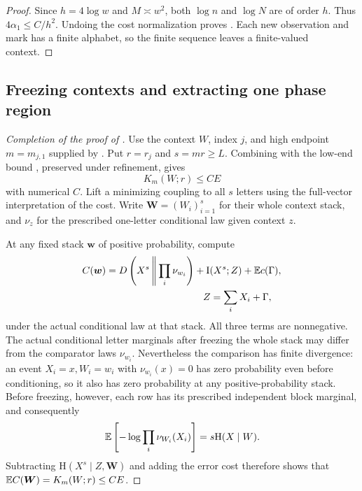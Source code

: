 \begin{proof}
Since $h=4\log w$ and $M\asymp w^2$, both $\log n$ and $\log N$ are of
order $h$. Thus $4\alpha_1\le C/h^2$. Undoing the cost normalization proves
. Each new observation and mark
has a finite alphabet, so the finite sequence leaves a finite-valued context.
\end{proof}

\subsection{Freezing contexts and extracting one phase region}

\begin{proof}[Completion of the proof of ]
Use the context $W$, index $j$, and high endpoint $m=m_{j,1}$ supplied by
. Put $r=r_j$ and $s=mr\ge L$.
Combining  with the low-end bound
, preserved under refinement, gives
\begin{equation}
 K_m(W;r)\le CE
 \label{entropy-refinement:high-cost}
\end{equation}
with numerical $C$. Lift a minimizing coupling to all $s$ letters using
the full-vector interpretation of the cost. Write
$\boldsymbol W=(W_i)_{i=1}^s$ for their whole context stack, and $\nu_z$
for the prescribed one-letter conditional law given context $z$.

At any fixed stack $\boldsymbol w$ of positive probability, compute
\begin{equation}
 \begin{split}
 C(\boldsymbol w)&=
 D\left(X^s\,\middle\|\,\prod_i\nu_{w_i}\right)
 +\mathrm I(X^s;Z)+\E c(\Gamma),\\
 &\hspace{35mm}Z=\sum_iX_i+\Gamma,
 \end{split}
 \label{entropy-refinement:frozen-cost}
\end{equation}
under the actual conditional law at that stack. All three terms are
nonnegative. The actual conditional letter marginals after freezing the
whole stack may differ from the comparator laws $\nu_{w_i}$.
Nevertheless the comparison has finite divergence: an event
$X_i=x,W_i=w_i$ with $\nu_{w_i}(x)=0$ has zero probability even before
conditioning, so it also has zero probability at any positive-probability stack.
Before freezing, however, each row has its prescribed independent block
marginal, and consequently
\[
 \mathbb E\left[-\log\prod_i\nu_{W_i}(X_i)\right]=s\mathrm H(X\mid W).
\]
Subtracting $\mathrm H(X^s\mid Z,\boldsymbol W)$ and adding the error cost
therefore shows that $\mathbb E C(\boldsymbol W)=K_m(W;r)\le CE$.


\end{proof}
